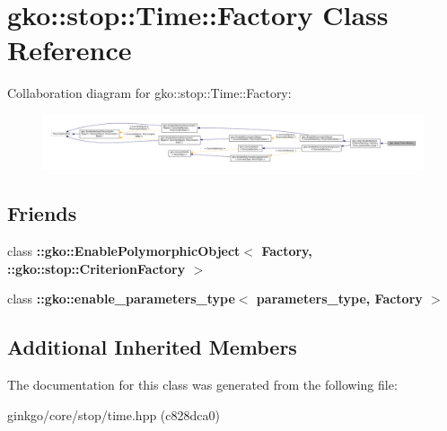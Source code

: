 \hypertarget{classgko_1_1stop_1_1Time_1_1Factory}{}\section{gko\+:\+:stop\+:\+:Time\+:\+:Factory Class Reference}
\label{classgko_1_1stop_1_1Time_1_1Factory}


Collaboration diagram for gko\+:\+:stop\+:\+:Time\+:\+:Factory\+:
\nopagebreak
\begin{figure}[H]
\begin{center}
\leavevmode
\includegraphics[width=350pt]{classgko_1_1stop_1_1Time_1_1Factory__coll__graph}
\end{center}
\end{figure}
\subsection*{Friends}
\begin{DoxyCompactItemize}
\item 
\mbox{\label{classgko_1_1stop_1_1Time_1_1Factory_aaa5507cf00e5361a77971746fefa42e6}} 
class {\bfseries \+::gko\+::\+Enable\+Polymorphic\+Object$<$ Factory, \+::gko\+::stop\+::\+Criterion\+Factory $>$}
\item 
\mbox{\label{classgko_1_1stop_1_1Time_1_1Factory_a0d176cbd42d6214e11aee8c30ca256fc}} 
class {\bfseries \+::gko\+::enable\+\_\+parameters\+\_\+type$<$ parameters\+\_\+type, Factory $>$}
\end{DoxyCompactItemize}
\subsection*{Additional Inherited Members}


The documentation for this class was generated from the following file\+:\begin{DoxyCompactItemize}
\item 
ginkgo/core/stop/time.\+hpp (c828dca0)\end{DoxyCompactItemize}
